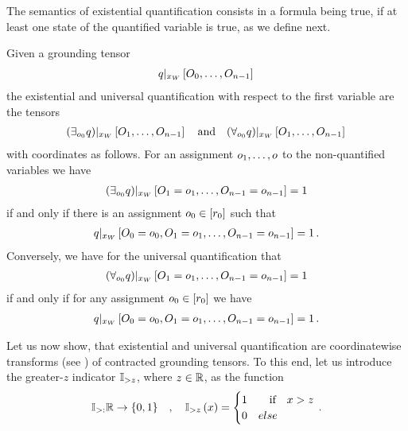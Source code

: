 The semantics of existential quantification consists in a formula being true, if at least one state of the quantified variable is true, as we define next.

\begin{definition}
    Given a grounding tensor
    \begin{align*}
        {q}|_{x_{W}} \left[O_{0},\ldots,O_{n-1}\right] \,
    \end{align*}
    the existential and universal quantification with respect to the first variable are the tensors
    \begin{align*}
        {\left(\exists_{o_{0}}q\right)}|_{x_{W}} \left[O_{1},\ldots,O_{n-1}\right] \quad \text{and} \quad
        {\left(\forall_{o_{0}}q\right)}|_{x_{W}} \left[O_{1},\ldots,O_{n-1}\right] \,
    \end{align*}
    with coordinates as follows.
    For an assignment $o_{1},\ldots,o$ to the non-quantified variables we have
    \begin{align*}
        {\left(\exists_{o_{0}}q\right)}|_{x_{W}} \left[O_{1}=o_{1},\ldots,O_{n-1}=o_{n-1}\right] = 1
    \end{align*}
    if and only if there is an assignment $o_{0}\in[r_{0}]$ such that
    \begin{align*}
        {q}|_{x_{W}} \left[O_{0}=o_{0},O_{1}=o_{1},\ldots,O_{n-1}=o_{n-1}\right] = 1 \, .
    \end{align*}
    Conversely, we have for the universal quantification that
    \begin{align*}
        {\left(\forall_{o_{0}}q\right)}|_{x_{W}} \left[O_{1}=o_{1},\ldots,O_{n-1}=o_{n-1}\right] = 1
    \end{align*}
    if and only if for any assignment $o_{0}\in[r_{0}]$ we have
    \begin{align*}
        {q}|_{x_{W}} \left[O_{0}=o_{0},O_{1}=o_{1},\ldots,O_{n-1}=o_{n-1}\right] = 1 \, .
    \end{align*}
\end{definition}


Let us now show, that existential and universal quantification are coordinatewise transforms (see ) of contracted grounding tensors.
To this end, let us introduce the greater-$z$ indicator $\mathbb{I}_{>z}$, where $z\in\mathbb{R}$, as the function
\begin{align*}
    \mathbb{I}_{>:} \mathbb{R} \rightarrow \{0,1\}
    \quad, \quad \mathbb{I}_{>z}\left(x\right) =
    \begin{cases}
        1 & \quad  \text{if} \quad x > z\\
        0 & else
    \end{cases} \, .
\end{align*}


